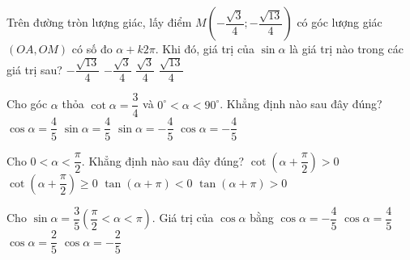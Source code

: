 \begin{ex}%
	Trên đường  tròn lượng giác, lấy điểm $M\left(-\dfrac{\sqrt{3}}{4};-\dfrac{\sqrt{13}}{4} \right)$ có góc lượng giác $(OA,OM)$ có số đo $\alpha+k2\pi$. Khi đó, giá trị của $\sin \alpha$ là giá trị nào trong các giá trị sau?
	 \choice
		{\True  $-\dfrac{\sqrt{13}}{4}$}
		 {$-\dfrac{\sqrt{3}}{4}$}
		{$\dfrac{\sqrt{3}}{4}$} 
		{$\dfrac{\sqrt{13}}{4}$} 
\end{ex}

\begin{ex}%
	Cho góc $\alpha $ thỏa  $\cot\alpha =\dfrac{3}{4} $ và $0^\circ <\alpha <90^\circ$. Khẳng định nào sau đây đúng?
	\choice 
		{$\cos\alpha =\dfrac{4}{5} $} 
		{\True $\sin \alpha =\dfrac{4}{5}  $}
		{$\sin\alpha =-\dfrac{4}{5} $} 
		{$\cos\alpha =-\dfrac{4}{5} $} 
\end{ex}

\begin{ex}%
	Cho $0<\alpha <\dfrac{\pi}{2}$. Khẳng định nào  sau đây đúng?
	 \choice
		{$\cot \left(\alpha +\dfrac{\pi}{2}  \right)>0$}
		{$\cot  \left(\alpha +\dfrac{\pi}{2} \right)\ge 0$}
		{$\tan (\alpha  +\pi)<0$}
		{\True  $\tan (\alpha +\pi)>0$}
\end{ex}

\begin{ex}%
	Cho $\sin \alpha =\dfrac{3}{5} \left(\dfrac{\pi}{2}  <\alpha <\pi \right)$. Giá trị của $\cos \alpha $ bằng
	 \choice
		 {\True $\cos \alpha =-\dfrac{4}{5} $}
		{$\cos \alpha =\dfrac{4}{5} $} 
		{$\cos \alpha  =\dfrac{2}{5} $}
		{$\cos \alpha  =-\dfrac{2}{5} $}
\end{ex}

